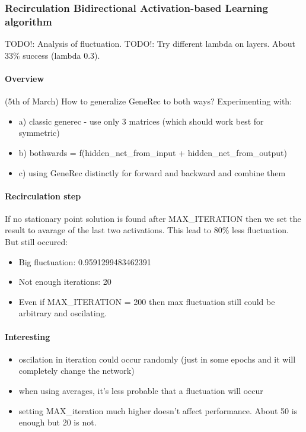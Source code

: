 
\subsubsection{Recirculation Bidirectional Activation-based Learning algorithm} 
\label{sec:our-bal-recirc}
TODO!: Analysis of fluctuation. 
TODO!: Try different lambda on layers. 
About 33\% success (lambda 0.3). 

\paragraph{Overview} 
(5th of March) 
How to generalize GeneRec to both ways? 
Experimenting with:
\begin{itemize} 
\item  a) classic generec - use only 3 matrices (which should work best for symmetric) 
\item  b) bothwards = f(hidden\_net\_from\_input + hidden\_net\_from\_output) 
\item  c) using GeneRec distinctly for forward and backward and combine them 
\end{itemize} 

\paragraph{Recirculation step} 
If no stationary point solution is found after MAX\_ITERATION then we set the result to avarage of the last two activations. This lead to 80\% less fluctuation. But still occured: 
\begin{itemize}
\item Big fluctuation: 0.9591299483462391
\item Not enough iterations: 20
\item Even if MAX\_ITERATION = 200 then max fluctuation still could be arbitrary and oscilating.
\end{itemize} 

\paragraph{Interesting} 
\begin{itemize} 
  \item oscilation in iteration could occur randomly (just in some epochs and it will completely change the network) 
  \item when using averages, it's less probable that a fluctuation will occur 
  \item setting MAX\_iteration much higher doesn't affect performance. About 50 is enough but 20 is not. 
\end{itemize} 
  
